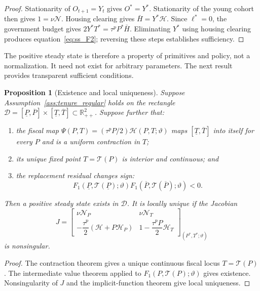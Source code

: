 \documentclass[11pt]{article}
\newtheorem{proposition}{Proposition}
\theoremstyle{definition}
\theoremstyle{remark}
\newcommand{\R}{\mathbb R}
\newcommand{\mcN}{\mathcal N}
\newcommand{\mcH}{\mathcal H}
\begin{document}
\begin{proof}
Stationarity of $O_{t+1}=Y_t$ gives $O^*=Y^*$.  Stationarity of the young cohort
then gives $1=\nu\mcN$.  Housing clearing gives
$\bar H=Y^*\mcH$.  Since $\ell^*=0$, the government budget gives
$2Y^*T^*=\tau^pP^*\bar H$.  Eliminating $Y^*$ using housing clearing produces
equation~\eqref{eq:ss_F2}; reversing these steps establishes sufficiency.
\end{proof}

The positive steady state is therefore a property of primitives and policy,
not a normalization.  It need not exist for arbitrary parameters.  The next
result provides transparent sufficient conditions.

\begin{proposition}[Existence and local uniqueness]
Suppose Assumption~\ref{ass:tenure_regular} holds on the rectangle
$\mathcal D=[\underline P,\overline P]\times
[\underline T,\overline T]\subset\R_{++}^2$.  Suppose further that:
\begin{enumerate}
 \item the fiscal map
 $\Psi(P,T)=(\tau^pP/2)\mcH(P,T;\vartheta)$ maps
 $[\underline T,\overline T]$ into itself for every $P$ and is a uniform
 contraction in $T$;
 \item its unique fixed point $T=\mathcal T(P)$ is interior and continuous;
 and
 \item the replacement residual changes sign:
 \begin{equation}
 F_1(\underline P,\mathcal T(\underline P);\vartheta)
 F_1(\overline P,\mathcal T(\overline P);\vartheta)<0.
 \label{eq:ss_sign_change}
 \end{equation}
\end{enumerate}
Then a positive steady state exists in $\mathcal D$.  It is locally unique if
the Jacobian
\begin{equation}
 J=\begin{bmatrix}
 \nu\mcN_P & \nu\mcN_T\\[2pt]
 -\dfrac{\tau^p}{2}(\mcH+P\mcH_P) &
 1-\dfrac{\tau^pP}{2}\mcH_T
 \end{bmatrix}_{(P^*,T^*;\vartheta)}
 \label{eq:ss_J}
\end{equation}
is nonsingular.
\end{proposition}

\begin{proof}
The contraction theorem gives a unique continuous fiscal locus
$T=\mathcal T(P)$.  The intermediate value theorem applied to
$F_1(P,\mathcal T(P);\vartheta)$ gives existence.  Nonsingularity of $J$ and
the implicit-function theorem give local uniqueness.
\end{proof}
\end{document}
